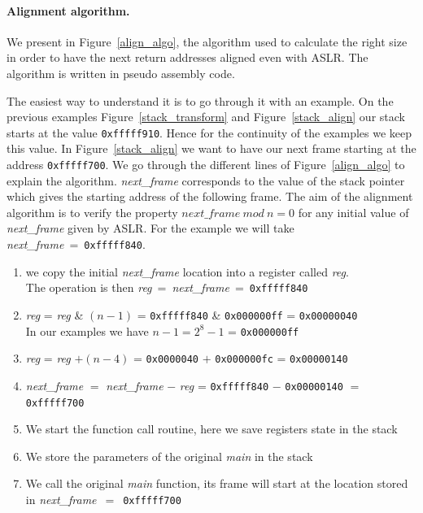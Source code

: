 \documentclass[11pt]{sdm}
\begin{document}
\paragraph{Alignment algorithm.}
\label{par:Alignment algorithm}
We present in Figure~\ref{align_algo}, the algorithm used to calculate the right size in order to have the next return addresses aligned even with ASLR. The algorithm is written in pseudo assembly code.

The easiest way to understand it is to go through it with an example. On the previous examples Figure~\ref{stack_transform} and Figure~\ref{stack_align} our stack starts at the value \texttt{0xfffff910}. Hence for the continuity of the examples we keep this value. 
In Figure~\ref{stack_align} we want to have our next frame starting at the address \texttt{0xfffff700}. 
We go through the different lines of Figure~\ref{align_algo} to explain the algorithm.
\textit{next\_frame} corresponds to the value of the stack pointer which gives the starting address of the following frame.
The aim of the alignment algorithm is to verify the property $\textit{next\_frame}~mod~n=0$ for any initial value of \textit{next\_frame} given by ASLR. For the example we will take \textit{next\_frame}~=~\texttt{0xfffff840}.\\

\begin{enumerate}
	\item we copy the initial \textit{next\_frame} location into a register called \textit{reg}.\\
		  The operation is then \textit{reg}~=~\textit{next\_frame}~=~\texttt{0xfffff840}
	\item \textit{reg} = \textit{reg} \& $(n-1)$ = \texttt{0xfffff840} \& \texttt{0x000000ff} = \texttt{0x00000040}\\
		In our examples we have $n-1 = 2^8-1$ = \texttt{0x000000ff}
	\item \textit{reg} = \textit{reg} $+(n-4)$ = \texttt{0x0000040} $+$ \texttt{0x000000fc} = \texttt{0x00000140}
	\item \textit{next\_frame} $=$ \textit{next\_frame} $-$ \textit{reg} = \texttt{0xfffff840} $-$ \texttt{0x00000140} $=$ \texttt{0xfffff700}
	\item We start the function call routine, here we save registers state in the stack
	\item We store the parameters of the original \textit{main} in the stack
	\item We call the original \textit{main} function, its frame will start at the location stored in \textit{next\_frame}~$=$~\texttt{0xfffff700}
\end{enumerate}
\end{document}
